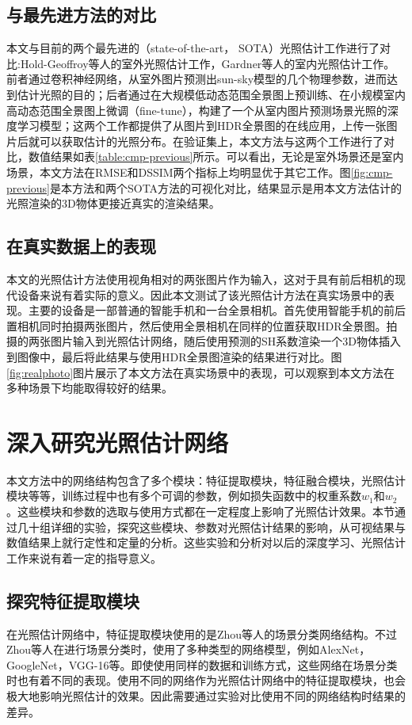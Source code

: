 \subsection{与最先进方法的对比}

本文与目前的两个最先进的（state-of-the-art， SOTA）光照估计工作进行了对比:Hold-Geoffroy等人\cite{hold2017deep}的室外光照估计工作，Gardner等人\cite{gardner2017learning}的室内光照估计工作。前者通过卷积神经网络，从室外图片预测出sun-sky模型\cite{hovsekhovsek2013adding}的几个物理参数，进而达到估计光照的目的；后者通过在大规模低动态范围全景图上预训练、在小规模室内高动态范围全景图上微调（fine-tune），构建了一个从室内图片预测场景光照的深度学习模型；这两个工作都提供了从图片到HDR全景图的在线应用，上传一张图片后就可以获取估计的光照分布。在验证集上，本文方法与这两个工作进行了对比，数值结果如表\ref{table:cmp-previous}所示。可以看出，无论是室外场景还是室内场景，本文方法在RMSE和DSSIM两个指标上均明显优于其它工作。图\ref{fig:cmp-previous}是本方法和两个SOTA方法的可视化对比，结果显示是用本文方法估计的光照渲染的3D物体更接近真实的渲染结果。


\subsection{在真实数据上的表现}
本文的光照估计方法使用视角相对的两张图片作为输入，这对于具有前后相机的现代设备来说有着实际的意义。因此本文测试了该光照估计方法在真实场景中的表现。主要的设备是一部普通的智能手机和一台全景相机。首先使用智能手机的前后置相机同时拍摄两张图片，然后使用全景相机在同样的位置获取HDR全景图。拍摄的两张图片输入到光照估计网络，随后使用预测的SH系数渲染一个3D物体插入到图像中，最后将此结果与使用HDR全景图渲染的结果进行对比。图\ref{fig:realphoto}{图片}展示了本文方法在真实场景中的表现，可以观察到本文方法在多种场景下均能取得较好的结果。


\section{深入研究光照估计网络}\label{sec:ablation-study}
本文方法中的网络结构包含了多个模块：特征提取模块，特征融合模块，光照估计模块等等，训练过程中也有多个可调的参数，例如损失函数中的权重系数$w_1$和$w_2$。这些模块和参数的选取与使用方式都在一定程度上影响了光照估计效果。本节通过几十组详细的实验，探究这些模块、参数对光照估计结果的影响，从可视结果与数值结果上就行定性和定量的分析。这些实验和分析对以后的深度学习、光照估计工作来说有着一定的指导意义。
\subsection{探究特征提取模块}
在光照估计网络中，特征提取模块使用的是Zhou等人\cite{zhou2017places}的场景分类网络结构。不过Zhou等人\cite{zhou2017places}在进行场景分类时，使用了多种类型的网络模型，例如AlexNet\cite{krizhevsky2012imagenet}，GoogleNet\cite{szegedy2015going}，VGG-16\cite{simonyan2014very}等。即使使用同样的数据和训练方式，这些网络在场景分类时也有着不同的表现。使用不同的网络作为光照估计网络中的特征提取模块，也会极大地影响光照估计的效果。因此需要通过实验对比使用不同的网络结构时结果的差异。

